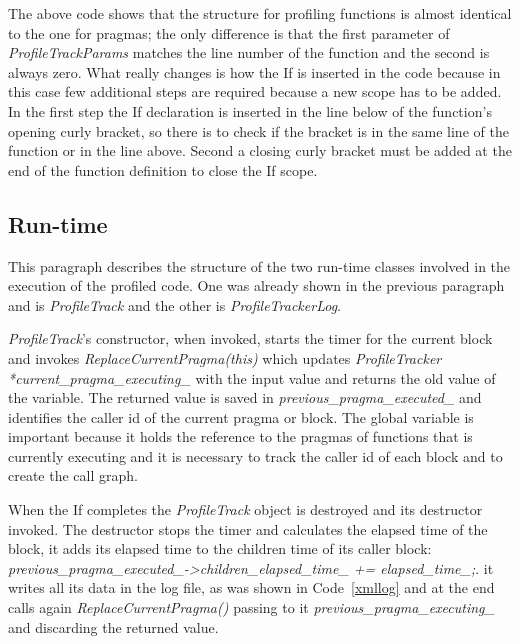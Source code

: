 \documentclass[a4paper,11pt,oneside]{book}
\begin{document}
The above code shows that the structure for profiling functions is almost identical to the one for pragmas; the only difference is that the first parameter of \emph{ProfileTrackParams} matches the line number of the function and the second is always zero. What really changes is how the If is inserted in the code because in this case few additional steps are required because a new scope has to be added. In the first step the If declaration is inserted in the line below of the function’s opening curly bracket, so there is to check if the bracket is in the same line of the function or in the line above. Second a closing curly bracket must be added at the end of the function definition to close the If scope.


\subsection{Run-time}
This paragraph describes the structure of the two run-time classes involved in the execution of the profiled code. One was already shown in the previous paragraph and is \emph{ProfileTrack} and the other is \emph{ProfileTrackerLog}. 

\emph{ProfileTrack}’s constructor, when invoked, starts the timer for the current block and invokes \emph{ReplaceCurrentPragma(this)} which updates \emph{ProfileTracker *current\_pragma\_executing\_} with the input value and returns the old value of the variable. The returned value is saved in \emph{previous\_pragma\_executed\_} and identifies the caller id of the current pragma or block. The global variable is important because it holds the reference to the pragmas of functions that is currently executing and it is necessary to track the caller id of each block and to create the call graph. 

When the If completes the \emph{ProfileTrack} object is destroyed and its destructor invoked. The destructor stops the timer and calculates the elapsed time of the block, it adds its elapsed time to the children time of its caller block:
 \emph{previous\_pragma\_executed\_->children\_elapsed\_time\_ += elapsed\_time\_;}. it writes all its data in the log file, as was shown in Code~\ref{xmllog} and at the end calls again \emph{ReplaceCurrentPragma()} passing to it \emph{previous\_pragma\_executing\_} and discarding the returned value.
\end{document}
